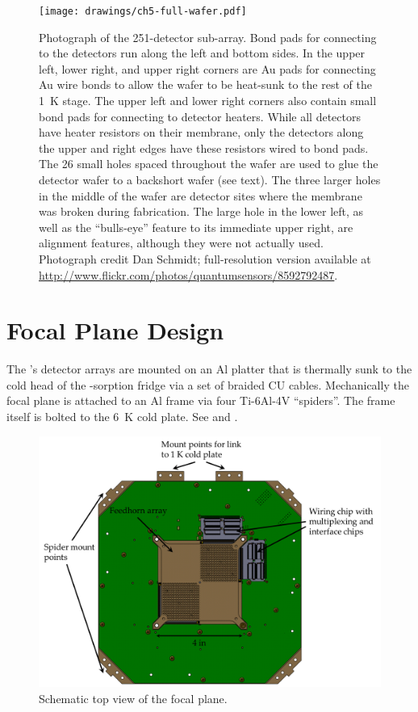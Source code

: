 \begin{figure}
\centering
\texttt{[image: drawings/ch5-full-wafer.pdf]}
\caption[Photograph of 251-detector sub-array]{
  Photograph of the 251-detector sub-array.
  Bond pads for connecting to the detectors run along the left and bottom sides.
  In the upper left, lower right, and upper right corners are Au pads for connecting Au wire bonds to allow the wafer to be heat-sunk to the rest of the \SI{1}{\K} stage.
  The upper left and lower right corners also contain small bond pads for connecting to detector heaters.
  While all detectors have heater resistors on their membrane, only the detectors along the upper and right edges have these resistors wired to bond pads.
  The 26 small holes spaced throughout the wafer are used to glue the detector wafer to a backshort wafer (see text).
  The three larger holes in the middle of the wafer are detector sites where the membrane was broken during fabrication.
  The large hole in the lower left, as well as the ``bulls-eye'' feature to its immediate upper right, are alignment features, although they were not actually used.
  Photograph credit Dan Schmidt; full-resolution version available at \protect\url{http://www.flickr.com/photos/quantumsensors/8592792487}.
}
\label{fig:ch5-full-wafer}
\end{figure}

\section{Focal Plane Design} \label{sec:ch5-focal-plane}

The \Imager's detector arrays are mounted on an Al platter that is thermally sunk to the cold head of the -sorption fridge via a set of braided CU cables.
Mechanically the focal plane is attached to an Al frame via four Ti-6Al-4V ``spiders''.
The frame itself is bolted to the \SI{6}{\K} cold plate.
See  and .

\begin{figure}
\centering
\includegraphics[width=\textwidth]{images/ch5-focal-overview-labeled.png}
\caption[Schematic top view of the focal plane]{
Schematic top view of the focal plane.
}
\label{fig:ch5-focal-overview-labeled}
\end{figure}

